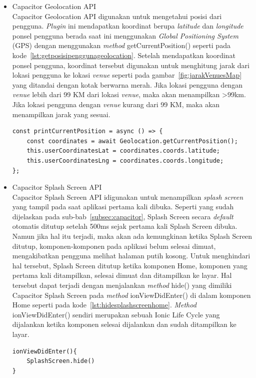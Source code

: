 \begin{itemize}
	\item Capacitor Geolocation API \\
	 Capacitor Geolocation API digunakan untuk mengetahui posisi dari pengguna. \textit{Plugin} ini mendapatkan koordinat berupa \textit{latitude} dan \textit{longitude} ponsel pengguna berada saat ini menggunakan \textit{Global Positioning System} (GPS) dengan menggunakan \textit{method} getCurrentPosition() seperti pada kode~\ref{lst:getposisipenggunageolocation}. Setelah mendapatkan koordinat ponsel pengguna, koordinat tersebut digunakan untuk menghitung jarak dari lokasi pengguna ke lokasi \textit{venue} seperti pada gambar~\ref{fig:jarakVenuesMap} yang ditandai dengan kotak berwarna merah. Jika lokasi pengguna dengan \textit{venue} lebih dari 99 KM dari lokasi \textit{venue}, maka akan menampilkan >99km. Jika lokasi pengguna dengan \textit{venue} kurang dari 99 KM, maka akan menampilkan jarak yang sesuai. 
\newpage
\begin{lstlisting}[label={lst:getposisipenggunageolocation}, caption=\textit{Method} getCurrentPosition( Pada Geolocation API]
const printCurrentPosition = async () => {
	const coordinates = await Geolocation.getCurrentPosition();
    this.userCoordinatesLat = coordinates.coords.latitude;
    this.userCoordinatesLng = coordinates.coords.longitude;
};
\end{lstlisting}
	 
	 \item Capacitor Splash Screen API \\
	 Capacitor Splash Screen API idigunakan untuk menampilkan \textit{splash screen} yang tampil pada saat aplikasi pertama kali dibuka. Seperti yang sudah dijelaskan pada sub-bab~\ref{subsec:capacitor}, Splash Screen secara \textit{default} otomatis ditutup setelah 500ms sejak pertama kali Splash Screen dibuka. Namun jika hal itu terjadi, maka akan ada kemungkinan ketika Splash Screen ditutup, komponen-komponen pada aplikasi belum selesai dimuat, mengakibatkan pengguna melihat halaman putih kosong. Untuk menghindari hal tersebut, Splash Screen ditutup ketika komponen Home, komponen yang pertama kali ditampilkan, selesai dimuat dan ditampilkan ke layar. Hal tersebut dapat terjadi dengan menjalankan \textit{method} hide() yang dimiliki Capacitor Splash Screen pada \textit{method} ionViewDidEnter() di dalam komponen Home seperti pada kode~\ref{lst:hidesplashscreenhome}. \textit{Method} ionViewDidEnter() sendiri merupakan sebuah Ionic Life Cycle yang dijalankan ketika komponen selesai dijalankan dan sudah ditampilkan ke layar. 
	 
\begin{lstlisting}[label={lst:hidesplashscreenhome}, caption=\textit{Method} hide() Pada Splash Screen API]
ionViewDidEnter(){
	SplashScreen.hide()
}
\end{lstlisting}

\end{itemize}


